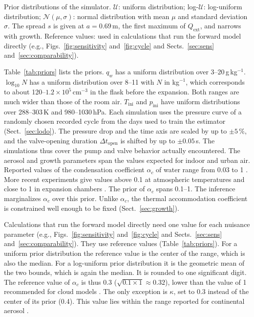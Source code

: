 \documentclass[preprint,review,12pt,authoryear]{elsarticle}
\begin{document}
\begin{table}[!htbp]
\centering
\caption{Prior distributions of the simulator. $\mathcal{U}$: uniform distribution; log-$\mathcal{U}$:
log-uniform distribution; $\mathcal{N}(\mu, \sigma)$: normal distribution with mean $\mu$ and standard
deviation $\sigma$. The
spread $s$ is given at $a = 0.69$\,\textmu m, the first maximum of $Q_\mathrm{ext}$, and narrows with
growth. Reference values: used in calculations that run the forward model directly (e.g.,
Figs.~\ref{fig:sensitivity} and~\ref{fig:cycle} and Sects.~\ref{sec:sens} and~\ref{sec:comparability}).}
\label{tab:priors}
\begin{adjustbox}{max width=\textwidth}\small\end{adjustbox}
\end{table}
Table~\ref{tab:priors} lists the priors. $q_w$ has a uniform distribution over 3--20\,g\,kg$^{-1}$.
$\log_{10}N$ has a uniform distribution over 8--11 with $N$ in kg$^{-1}$, which corresponds to about
120--$1.2\times10^5$\,cm$^{-3}$ in
the flask before the expansion. Both ranges are much wider than those of the room air. $T_\mathrm{ini}$
and $p_\mathrm{ini}$ have uniform distributions over 288--303\,K and 980--1030\,hPa. Each simulation uses
the pressure curve of a randomly chosen recorded cycle from the days used to train the estimator
(Sect.~\ref{sec:lodo}). The pressure drop and the time axis are scaled by up to $\pm5$\,\%, and the
valve-opening duration $\Delta t_\mathrm{open}$ is shifted by up to $\pm0.05$\,s. The simulations thus cover
the pump and valve behavior actually encountered. The
aerosol and growth parameters span the values expected for indoor and urban air. Reported values of
the condensation coefficient $\alpha_c$ of water range from 0.03 to 1 \citep{mozurkewich1986aerosol}.
More recent experiments give values above 0.1 at atmospheric temperatures and close to 1 in
expansion chambers \citep{davidovits2004mass,winkler2004mass}.
The prior of $\alpha_c$ spans 0.1--1. The inference marginalizes $\alpha_c$ over this prior.
Unlike $\alpha_c$, the thermal accommodation coefficient is constrained well enough to be fixed
(Sect.~\ref{sec:growth}).

Calculations that run the forward model directly need one value for each
nuisance parameter (e.g., Figs.~\ref{fig:sensitivity} and~\ref{fig:cycle} and Sects.~\ref{sec:sens}
and~\ref{sec:comparability}). They use reference values (Table~\ref{tab:priors}). For a uniform prior
distribution
the reference value is the center of the range, which is also the median. For a log-uniform prior
distribution it is the
geometric mean of the two bounds, which is again the median. It is rounded to one significant digit. The
reference value of $\alpha_c$ is
thus 0.3
($\sqrt{0.1 \times 1} \approx 0.32$), lower than the value of 1 recommended for cloud
models \citep{laaksonen2005commentary}. The only exception is $\kappa$, set to 0.3 instead of the
center of its prior (0.4). This value lies within the range reported for continental aerosol
\citep{petters2007single}.
\end{document}
